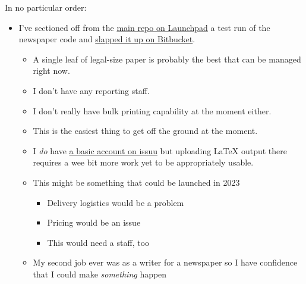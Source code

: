 In no particular order:

\begin{itemize}
\tightlist
\item
  I've sectioned off from the
  \href{https://code.launchpad.net/~skellat/+git/auto-newspaper}{main
  repo on Launchpad} a test run of the newspaper code and
  \href{https://bitbucket.org/kellat/kellat.bitbucket.io/src/main/}{slapped
  it up on Bitbucket}.

  \begin{itemize}
  \tightlist
  \item
    A single leaf of legal-size paper is probably the best that can be
    managed right now.
  \item
    I don't have any reporting staff.
  \item
    I don't really have bulk printing capability at the moment either.
  \item
    This is the easiest thing to get off the ground at the moment.
  \item
    I \emph{do} have \href{https://issuu.com/coyoteworks}{a basic
    account on issuu} but uploading LaTeX output there requires a wee
    bit more work yet to be appropriately usable.
  \item
    This might be something that could be launched in 2023

    \begin{itemize}
    \tightlist
    \item
      Delivery logistics would be a problem
    \item
      Pricing would be an issue
    \item
      This would need a staff, too
    \end{itemize}
  \item
    My second job ever was as a writer for a newspaper so I have
    confidence that I could make \emph{something} happen


\end{itemize}
\end{itemize}
